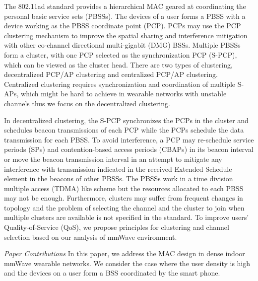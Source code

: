 \documentclass[10pt, conference, letterpaper]{IEEEtran}
\begin{document}
The 802.11ad standard provides a hierarchical MAC geared at coordinating the personal basic service sets (PBSSs). The devices of a user forms a PBSS with a device working as the PBSS coordinate point (PCP). PCPs may use the PCP clustering mechanism to improve the spatial sharing and interference mitigation with other co-channel directional multi-gigabit (DMG) BSSs. Multiple PBSSs form a cluster, with one PCP selected as the synchronization PCP (S-PCP), which can be viewed as the cluster head.
There are two types of clustering, decentralized PCP/AP clustering and centralized PCP/AP clustering. Centralized clustering requires synchronization and coordination of multiple S-APs, which might be hard to achieve in wearable networks with unstable channels thus we focus on the decentralized clustering. 

In decentralized clustering, the S-PCP synchronizes the PCPs in the cluster and schedules beacon transmissions of each PCP while the PCPs schedule the data transmission for each PBSS. To avoid interference, a PCP may re-schedule service periods (SPs) and contention-based access periods (CBAPs) in its beacon interval or move the beacon transmission interval in an attempt to mitigate any interference with transmission indicated in the received Extended Schedule element in the beacons of other PBSSs. The PBSSs work in a time division multiple access (TDMA) like scheme but the resources allocated to each PBSS may not be enough. Furthermore, clusters may suffer from frequent changes in topology and the problem of selecting the channel and the cluster to join when multiple clusters are available is not specified in the standard. To improve users' Quality-of-Service (QoS), we propose principles for clustering and channel selection based on our analysis of mmWave environment.

\emph{Paper Contributions}
In this paper, we address the MAC design in dense indoor mmWave wearable networks. We consider the case where the user density is high and the devices on a user form a BSS coordinated by the smart phone. %
\end{document}

